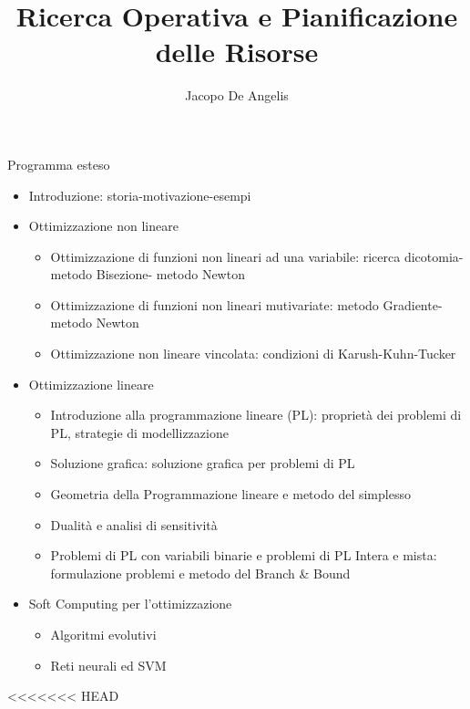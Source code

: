 \documentclass[11pt,a4paper]{book}
\begin{document}
\title{Ricerca Operativa e Pianificazione delle Risorse}
\author{Jacopo De Angelis}
\maketitle

\pagebreak
\tableofcontents
\pagebreak

\begin{LARGE}
Programma esteso
\end{LARGE}

\begin{itemize}
\item Introduzione: storia-motivazione-esempi

    \item Ottimizzazione non lineare
    \begin{itemize}
        \item Ottimizzazione di funzioni non lineari ad una variabile: ricerca dicotomia-metodo Bisezione- metodo Newton
        \item Ottimizzazione di funzioni non lineari mutivariate: metodo Gradiente-metodo Newton
        \item Ottimizzazione non lineare vincolata: condizioni di Karush-Kuhn-Tucker
    \end{itemize}

    \item Ottimizzazione lineare
    \begin{itemize}
        \item Introduzione alla programmazione lineare (PL): proprietà dei problemi di PL, strategie di modellizzazione
        \item Soluzione grafica: soluzione grafica per problemi di PL
        \item Geometria della Programmazione lineare e metodo del simplesso
        \item Dualità e analisi di sensitività
        \item Problemi di PL con variabili binarie e problemi di PL Intera e mista: formulazione problemi e metodo del Branch & Bound
    \end{itemize}

    \item Soft Computing per l'ottimizzazione
    \begin{itemize}
        \item Algoritmi evolutivi
        \item Reti neurali ed SVM
    \end{itemize}
\end{itemize}
\pagebreak

<<<<<<< HEAD
\end{document}
